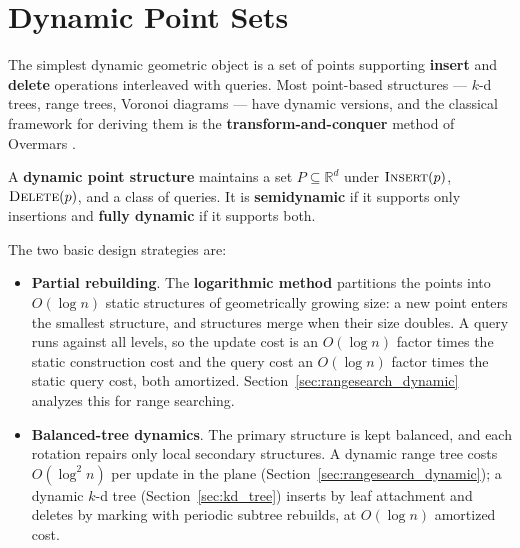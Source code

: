 
\section{Dynamic Point Sets}
\label{sec:dynamic_point_sets}

The simplest dynamic geometric object is a set of points supporting
\textbf{insert} and \textbf{delete} operations interleaved with queries.
Most point-based structures --- $k$-d trees, range trees, Voronoi diagrams
--- have dynamic versions, and the classical framework for deriving them is
the \textbf{transform-and-conquer} method of Overmars \cite{overmars1983}.

\begin{definition}\label{def:dynamic_structure}
  A \textbf{dynamic point structure} maintains a set $P \subseteq
  \mathbb{R}^d$ under $\textsc{Insert}(p)$, $\textsc{Delete}(p)$, and a class
  of queries. It is \textbf{semidynamic} if it supports
  only insertions and \textbf{fully dynamic} if it supports both.
\end{definition}

The two basic design strategies are:

\begin{itemize}
  \item \textbf{Partial rebuilding}. The
    \textbf{logarithmic method} partitions the points into $O(\log n)$
    static structures of geometrically growing size: a new point enters the
    smallest structure, and structures merge when their size doubles. A
    query runs against all levels, so the update cost is an $O(\log n)$
    factor times the static construction cost and the query cost an
    $O(\log n)$ factor times the static query cost, both amortized.
    Section~\ref{sec:rangesearch_dynamic} analyzes this for range searching.
  \item \textbf{Balanced-tree dynamics}. The primary structure is kept
    balanced, and each rotation repairs only local secondary structures. A
    dynamic range tree costs $O(\log^2 n)$ per update in the plane
    (Section~\ref{sec:rangesearch_dynamic}); a dynamic $k$-d tree
    (Section~\ref{sec:kd_tree}) inserts by leaf attachment and deletes by
    marking with periodic subtree rebuilds, at $O(\log n)$ amortized cost.
\end{itemize}

